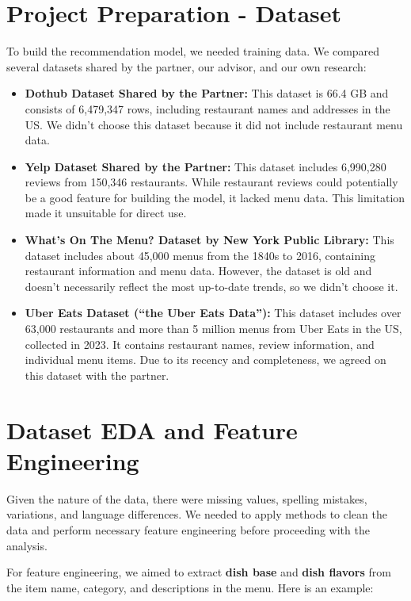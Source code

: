 \documentclass[
  11pt,
  a4paper,
  DIV=11,
  numbers=noendperiod]{scrartcl}
\providecommand{\tightlist}{%
  \setlength{\itemsep}{0pt}\setlength{\parskip}{0pt}}\usepackage{longtable,booktabs,array}
\begin{document}
\section{Project Preparation -
Dataset}\label{project-preparation---dataset}

To build the recommendation model, we needed training data. We compared
several datasets shared by the partner, our advisor, and our own
research:

\begin{itemize}
\tightlist
\item
  \textbf{Dothub Dataset Shared by the Partner:} This dataset is 66.4 GB
  and consists of 6,479,347 rows, including restaurant names and
  addresses in the US. We didn't choose this dataset because it did not
  include restaurant menu data.
\item
  \textbf{Yelp Dataset Shared by the Partner:} This dataset includes
  6,990,280 reviews from 150,346 restaurants. While restaurant reviews
  could potentially be a good feature for building the model, it lacked
  menu data. This limitation made it unsuitable for direct use.
\item
  \textbf{What's On The Menu? Dataset by New York Public Library:} This
  dataset includes about 45,000 menus from the 1840s to 2016, containing
  restaurant information and menu data. However, the dataset is old and
  doesn't necessarily reflect the most up-to-date trends, so we didn't
  choose it.
\item
  \textbf{Uber Eats Dataset (``the Uber Eats Data''):} This dataset
  includes over 63,000 restaurants and more than 5 million menus from
  Uber Eats in the US, collected in 2023. It contains restaurant names,
  review information, and individual menu items. Due to its recency and
  completeness, we agreed on this dataset with the partner.
\end{itemize}

\section{Dataset EDA and Feature
Engineering}\label{dataset-eda-and-feature-engineering}

Given the nature of the data, there were missing values, spelling
mistakes, variations, and language differences. We needed to apply
methods to clean the data and perform necessary feature engineering
before proceeding with the analysis.

For feature engineering, we aimed to extract \textbf{dish base} and
\textbf{dish flavors} from the item name, category, and descriptions in
the menu. Here is an example:
\end{document}

